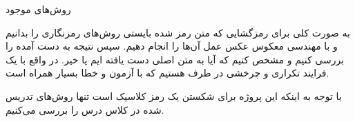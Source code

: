 \Problem
{روش‌های موجود}
{
به صورت کلی برای رمزگشایی که متن رمز شده بایستی روش‌های رمزنگاری را بدانیم و با مهندسی معکوس عکس عمل آن‌ها را انجام دهیم.
سپس نتیجه به دست آمده را بررسی کنیم و مشخص کنیم که آیا به متن اصلی دست یافته ایم یا خیر.
در واقع با یک فرایند تکراری و چرخشی در طرف هستیم که با آزمون و خطا بسیار همراه است.

با توجه به اینکه این پروژه برای شکستن یک رمز کلاسیک است تنها روش‌های تدریس شده در کلاس درس را بررسی می‌کنیم.
}
